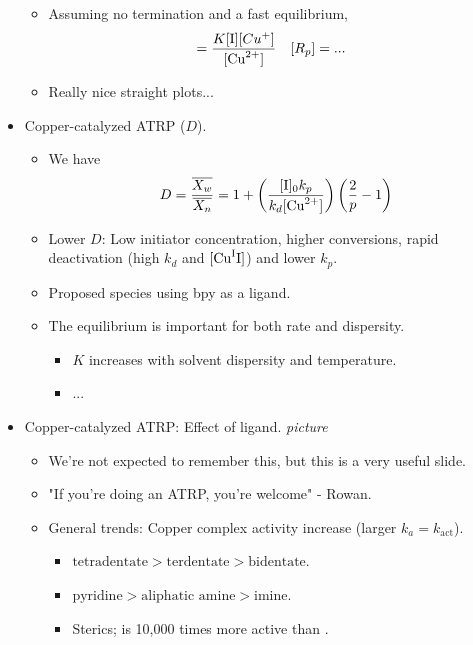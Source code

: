 \documentclass[../notes.tex]{subfiles}
\begin{document}
\begin{itemize}
\begin{itemize}
        \item Assuming no termination and a fast equilibrium,
        \begin{align*}
            [\ce{RM*}] &= \frac{K[\ce{I}][Cu^+]}{[\ce{Cu^2+}]}&
            [R_p] &= ...
        \end{align*}
        \item Really nice straight plots...
    \end{itemize}
    \item Copper-catalyzed ATRP ($D$).
    \begin{itemize}
        \item We have
        \begin{equation*}
            D = \frac{\overline{X_w}}{\overline{X_n}}
            = 1+\left( \frac{[\ce{I}]_0k_p}{k_d[\ce{Cu^2+}]} \right)\left( \frac{2}{p}-1 \right)
        \end{equation*}
        \item Lower $D$: Low initiator concentration, higher conversions, rapid deactivation (high $k_d$ and $[\ce{Cu^II}]$) and lower $k_p$.
        \item Proposed  species using bpy as a ligand.
        \item The equilibrium is important for both rate and dispersity.
        \begin{itemize}
            \item $K$ increases with solvent dispersity and temperature.
            \item ...
        \end{itemize}
    \end{itemize}
    \item Copper-catalyzed ATRP: Effect of ligand.
    \emph{picture}
    \begin{itemize}
        \item We're not expected to remember this, but this is a very useful slide.
        \item "If you're doing an ATRP, you're welcome" - Rowan.
        \item General trends: Copper complex activity increase (larger $k_a=k_\text{act}$).
        \begin{itemize}
            \item $\text{tetradentate}>\text{terdentate}>\text{bidentate}$.
            \item $\text{pyridine}>\text{aliphatic amine}>\text{imine}$.
            \item Sterics;  is 10,000 times more active than .
        \end{itemize}
    \end{itemize}
\end{itemize}
\end{document}

